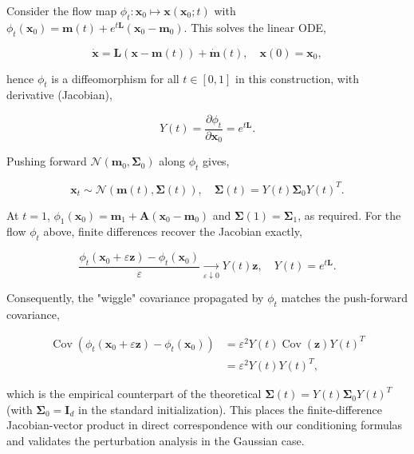 Consider the flow map $\phi_t : \mathbf x_0 \mapsto \mathbf x(\mathbf x_0; t)$ with $\phi_t(\mathbf x_0) = \boldsymbol m(t) + e^{t\mathbf L} (\mathbf x_0 - \boldsymbol m_0).$ This solves the linear ODE,

$$
\dot{\mathbf x} = \mathbf L\left(\mathbf x - \boldsymbol m(t)\right) + \dot{\boldsymbol m}(t), \quad \mathbf x(0)=\mathbf x_0,
$$

hence $\phi_t$ is a diffeomorphism for all $t \in [0,1]$ in this construction, with derivative (Jacobian),

$$
Y(t) = \frac{\partial \phi_t}{\partial \mathbf x_0} = e^{t\mathbf L}.
$$

Pushing forward $\mathcal{N}(\boldsymbol m_0,\boldsymbol\Sigma_0)$ along $\phi_t$ gives,

$$
\mathbf x_t \sim \mathcal N \left(\boldsymbol m(t),\boldsymbol\Sigma(t)\right),
\quad
\boldsymbol \Sigma(t) = Y(t) \boldsymbol \Sigma_0 Y(t)^T.
$$

At $t=1$, $\phi_1(\mathbf x_0)=\boldsymbol m_1+\mathbf A(\mathbf x_0-\boldsymbol m_0)$ and $\boldsymbol\Sigma(1)=\boldsymbol\Sigma_1$, as required. For the flow $\phi_t$ above, finite differences recover the Jacobian exactly,

$$
\frac{\phi_t(\mathbf x_0 + \varepsilon \mathbf z) - \phi_t(\mathbf x_0)}{\varepsilon}
\xrightarrow[\varepsilon\downarrow 0]{}
Y(t) \mathbf z,
\quad
Y(t) = e^{t \mathbf L}.
$$

Consequently, the "wiggle" covariance propagated by $\phi_t$ matches the push‐forward covariance,

\begin{align*}
\operatorname{Cov}\left(\phi_t(\mathbf x_0 + \varepsilon \mathbf z) - \phi_t(\mathbf x_0)\right) & = \varepsilon^2 Y(t) \operatorname{Cov}(\mathbf z) Y(t)^T \\
& = \varepsilon^2 Y(t) Y(t)^T, 
\end{align*}

which is the empirical counterpart of the theoretical $\boldsymbol \Sigma(t) = Y(t) \boldsymbol \Sigma_0 Y(t)^T$ (with $\boldsymbol \Sigma_0 = \mathbf I_d$ in the standard initialization). This places the finite-difference Jacobian-vector product in direct correspondence with our conditioning formulas and validates the perturbation analysis in the Gaussian case.
